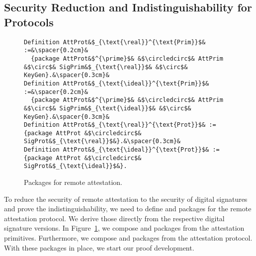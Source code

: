 \subsection{Security Reduction and Indistinguishability for Protocols}

\begin{figure}
    \begin{verbatim}
Definition AttProt&$_{\text{\real}}^{\text{Prim}}$& :=&\spacer{0.2cm}&
  {package AttProt&$^{\prime}$& &$\circledcirc$& AttPrim &$\circ$& SigPrim&$_{\text{\real}}$& &$\circ$& KeyGen}.&\spacer{0.3cm}&
Definition AttProt&$_{\text{\ideal}}^{\text{Prim}}$& :=&\spacer{0.2cm}&
  {package AttProt&$^{\prime}$& &$\circledcirc$& AttPrim &$\circ$& SigPrim&$_{\text{\ideal}}$& &$\circ$& KeyGen}.&\spacer{0.3cm}&
Definition AttProt&$_{\text{\real}}^{\text{Prot}}$& := {package AttProt &$\circledcirc$& SigProt&$_{\text{\real}}$&}.&\spacer{0.3cm}&
Definition AttProt&$_{\text{\ideal}}^{\text{Prot}}$& := {package AttProt &$\circledcirc$& SigProt&$_{\text{\ideal}}$&}.
    \end{verbatim}
   \caption{Packages for remote attestation.}
   \label{fig:attprots}
\end{figure}

%
To reduce the security of remote attestation
to the security of digital signatures and prove the 
indistinguishability, we need to define \real
and \ideal packages for the remote attestation protocol.
%
We derive those directly from the respective 
digital signature versions.
%
In Figure~\ref{fig:attprots}, we compose \real %
and \ideal packages %
from the attestation primitives.
%
Furthermore, we compose \real %
and 
\ideal packages %
from the attestation protocol.
%
With these packages in place, we start our proof
development.
%


